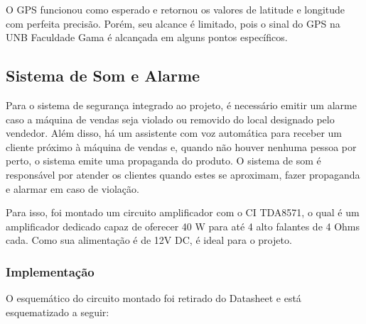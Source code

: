 O GPS funcionou como esperado e retornou os valores de latitude e longitude com perfeita precisão. Porém, seu alcance é limitado, pois o sinal do GPS na UNB Faculdade Gama é alcançada em alguns pontos específicos.

\subsection{Sistema de Som e Alarme}

Para o sistema de segurança integrado ao projeto, é necessário emitir um alarme caso a máquina de vendas seja violado ou removido do local designado pelo vendedor. Além disso, há um assistente com voz automática para receber um cliente próximo à máquina de vendas e, quando não houver nenhuma pessoa por perto, o sistema emite uma propaganda do produto. O sistema de som é responsável por atender os clientes quando estes se aproximam, fazer propaganda e alarmar em caso de violação.

Para isso, foi montado um circuito amplificador com o CI TDA8571, o qual é um amplificador dedicado capaz de oferecer 40 W para até 4 alto falantes de 4 Ohms cada. Como sua alimentação é de 12V DC, é ideal para o projeto.

\newpage
\subsubsection{Implementação}

O esquemático do circuito montado foi retirado do Datasheet \cite{mq2} e está esquematizado a seguir:

